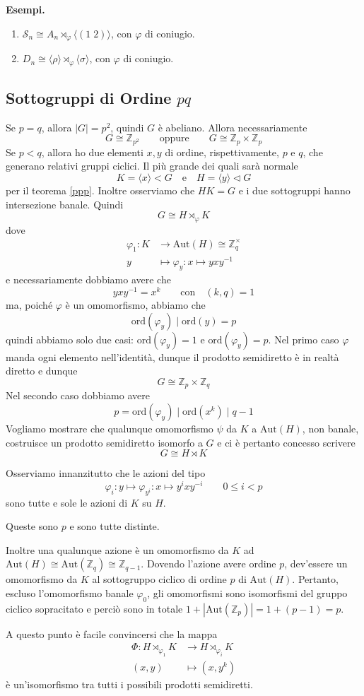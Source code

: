 \documentclass[a4paper]{article}
\theoremstyle{remark}
\theoremstyle{definition}
\newcommand{\Aut}[1]{\mathrm{Aut}\left( #1 \right)}
\newcommand{\fun}[5]{\begin{align*}
	#1 \colon #2 &\to #3 \\
	#4 &\mapsto #5
	\end{align*}}
\begin{document}
\begin{multicols}{2}
\textbf{Esempi.}
\begin{enumerate}
	\item $ \mathcal{S}_n \cong A_n \rtimes_\varphi \langle (1 \; 2) \rangle $, con $ \varphi $ di coniugio.
	\item $ D_n \cong \langle \rho \rangle \rtimes_\varphi \langle \sigma \rangle $, con $ \varphi $ di coniugio.
\end{enumerate}
\end{multicols}


\subsection{Sottogruppi di Ordine $ pq $}
\begin{multicols}{2}
	Se $ p = q $, allora $ |G| = p^2 $, quindi $ G $ è abeliano. Allora necessariamente
	\[ G \cong \mathbb{Z}_{p^2}  \qquad \text{oppure} \qquad G \cong \mathbb{Z}_{p}\times\mathbb{Z}_{p} \]
	Se $ p < q $, allora ho due elementi $ x, y $ di ordine, rispettivamente, $ p $ e $ q $, che generano relativi gruppi ciclici. Il più grande dei quali sarà normale $$  K = \langle x \rangle < G \quad\text{e}\quad H = \langle y \rangle \lhd G $$ per il teorema \ref{ppp}. Inoltre osserviamo che $ HK = G $ e i due sottogruppi hanno intersezione banale. Quindi
	\[ G \cong H \rtimes_\varphi K \]
	dove
	\fun{\varphi_1}{K}{\Aut{H} \cong \mathbb{Z}_q^\times}{y}{\varphi_y: x \mapsto yxy^{-1}}
	e necessariamente dobbiamo avere che
	\[ yxy^{-1} = x^k \qquad\text{con}\quad (k, q) = 1 \]
	ma, poiché $ \varphi $ è un omomorfismo, abbiamo che
	\[ \text{ord}\left(\varphi_y\right) \mid \text{ord}(y) = p \]
	quindi abbiamo solo due casi: $ \text{ord}\left(\varphi_y\right) = 1 $ e $ \text{ord}\left(\varphi_y\right) = p $. Nel primo caso $ \varphi $ manda ogni elemento nell'identità, dunque il prodotto semidiretto è in realtà diretto e dunque
	\[ G \cong \mathbb{Z}_{p}\times\mathbb{Z}_{q} \]
	Nel secondo caso dobbiamo avere $$  p = \text{ord}\left(\varphi_y\right) \mid \text{ord}(x^k) \mid q-1  $$
	Vogliamo mostrare che qualunque omomorfismo $ \psi $ da $ K $ a $ \Aut{H} $, non banale, costruisce un prodotto semidiretto isomorfo a $ G $ e ci è pertanto concesso scrivere
	\[ G \cong H \rtimes K \]
	
	Osserviamo innanzitutto che le azioni del tipo
	\[ \varphi_i: y \mapsto \varphi_{y^i}: x \mapsto y^ixy^{-i} \qquad 0 \leq i < p \]
	sono tutte e sole le azioni di $ K $ su $ H $.
	
	Queste sono $ p $ e sono tutte distinte.
	
	Inoltre una qualunque azione è un omomorfismo da $ K $ ad $ \Aut{H} \cong \Aut{\mathbb{Z}_q} \cong \mathbb{Z}_{q-1} $. Dovendo l'azione avere ordine $ p $, dev'essere un omomorfismo da $ K $ al sottogruppo ciclico di ordine $ p $ di $ \Aut{H} $. Pertanto, escluso l'omomorfismo banale $ \varphi_0 $, gli omomorfismi sono isomorfismi del gruppo ciclico sopracitato e perciò sono in totale $ 1 + \left|\Aut{\mathbb{Z}_p}\right| = 1 + (p-1) = p$.
	
	A questo punto è facile convincersi che la mappa \fun{\Phi}{H \rtimes_{\varphi_1} K}{H \rtimes_{\varphi_i} K}{(x, y)}{(x, y^{k})} è un'isomorfismo tra tutti i possibili prodotti semidiretti.
\end{multicols}
\end{document}
